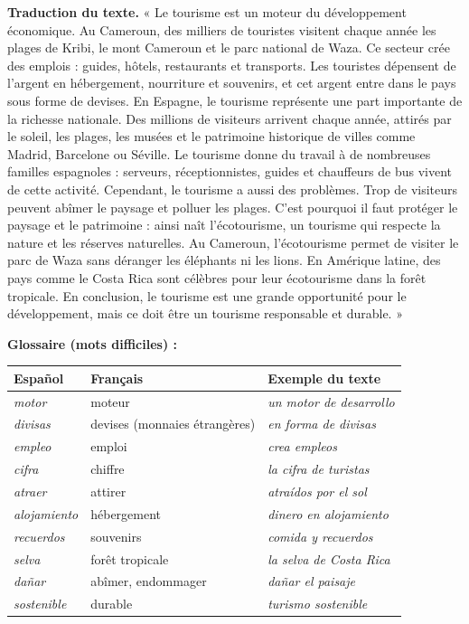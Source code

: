 \documentclass[11pt]{article}
\newcommand{\esp}[1]{\ifmmode\text{\textit{#1}}\else\begingroup\selectlanguage{spanish}\itshape #1\endgroup\fi}
\begin{document}
\textbf{Traduction du texte.} « Le tourisme est un moteur du développement économique. Au Cameroun, des milliers de touristes visitent chaque année les plages de Kribi, le mont Cameroun et le parc national de Waza. Ce secteur crée des emplois : guides, hôtels, restaurants et transports. Les touristes dépensent de l'argent en hébergement, nourriture et souvenirs, et cet argent entre dans le pays sous forme de devises. En Espagne, le tourisme représente une part importante de la richesse nationale. Des millions de visiteurs arrivent chaque année, attirés par le soleil, les plages, les musées et le patrimoine historique de villes comme Madrid, Barcelone ou Séville. Le tourisme donne du travail à de nombreuses familles espagnoles : serveurs, réceptionnistes, guides et chauffeurs de bus vivent de cette activité. Cependant, le tourisme a aussi des problèmes. Trop de visiteurs peuvent abîmer le paysage et polluer les plages. C'est pourquoi il faut protéger le paysage et le patrimoine : ainsi naît l'écotourisme, un tourisme qui respecte la nature et les réserves naturelles. Au Cameroun, l'écotourisme permet de visiter le parc de Waza sans déranger les éléphants ni les lions. En Amérique latine, des pays comme le Costa Rica sont célèbres pour leur écotourisme dans la forêt tropicale. En conclusion, le tourisme est une grande opportunité pour le développement, mais ce doit être un tourisme responsable et durable. »

\textbf{Glossaire (mots difficiles) :}

\begin{center}
\begin{tabularx}{\linewidth}{|X|X|X|}
\hline
\rowcolor{popblueL} Español & Français & Exemple du texte \\
\hline
\esp{motor} & moteur & \esp{un motor de desarrollo} \\
\hline
\esp{divisas} & devises (monnaies étrangères) & \esp{en forma de divisas} \\
\hline
\esp{empleo} & emploi & \esp{crea empleos} \\
\hline
\esp{cifra} & chiffre & \esp{la cifra de turistas} \\
\hline
\esp{atraer} & attirer & \esp{atraídos por el sol} \\
\hline
\esp{alojamiento} & hébergement & \esp{dinero en alojamiento} \\
\hline
\esp{recuerdos} & souvenirs & \esp{comida y recuerdos} \\
\hline
\esp{selva} & forêt tropicale & \esp{la selva de Costa Rica} \\
\hline
\esp{dañar} & abîmer, endommager & \esp{dañar el paisaje} \\
\hline
\esp{sostenible} & durable & \esp{turismo sostenible} \\
\hline
\end{tabularx}
\end{center}
\end{document}
